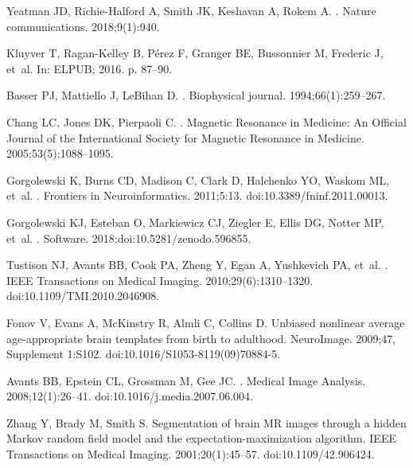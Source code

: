 \documentclass[10pt,letterpaper]{article}
\begin{document}
\begin{thebibliography}{100}
Yeatman JD, Richie-Halford A, Smith JK, Keshavan A, Rokem A.
.
\newblock Nature communications. 2018;9(1):940.

Kluyver T, Ragan-Kelley B, P{\'e}rez F, Granger BE, Bussonnier M, Frederic J,
  et~al.
\newblock In: ELPUB; 2016. p. 87--90.

Basser PJ, Mattiello J, LeBihan D.
.
\newblock Biophysical journal. 1994;66(1):259--267.

Chang LC, Jones DK, Pierpaoli C.
.
\newblock Magnetic Resonance in Medicine: An Official Journal of the
  International Society for Magnetic Resonance in Medicine.
  2005;53(5):1088--1095.

Gorgolewski K, Burns CD, Madison C, Clark D, Halchenko YO, Waskom ML, et~al.
.
\newblock Frontiers in Neuroinformatics. 2011;5:13.
\newblock doi:{10.3389/fninf.2011.00013}.

Gorgolewski KJ, Esteban O, Markiewicz CJ, Ziegler E, Ellis DG, Notter MP,
  et~al.
.
\newblock Software. 2018;doi:{10.5281/zenodo.596855}.

Tustison NJ, Avants BB, Cook PA, Zheng Y, Egan A, Yushkevich PA, et~al.
.
\newblock IEEE Transactions on Medical Imaging. 2010;29(6):1310--1320.
\newblock doi:{10.1109/TMI.2010.2046908}.

Fonov V, Evans A, McKinstry R, Almli C, Collins D.
\newblock Unbiased nonlinear average age-appropriate brain templates from birth
  to adulthood.
\newblock NeuroImage. 2009;47, Supplement 1:S102.
\newblock doi:{10.1016/S1053-8119(09)70884-5}.

Avants BB, Epstein CL, Grossman M, Gee JC.
.
\newblock Medical Image Analysis. 2008;12(1):26--41.
\newblock doi:{10.1016/j.media.2007.06.004}.

Zhang Y, Brady M, Smith S.
\newblock Segmentation of brain {MR} images through a hidden {M}arkov random
  field model and the expectation-maximization algorithm.
\newblock IEEE Transactions on Medical Imaging. 2001;20(1):45--57.
\newblock doi:{10.1109/42.906424}.


\end{thebibliography}
\end{document}
